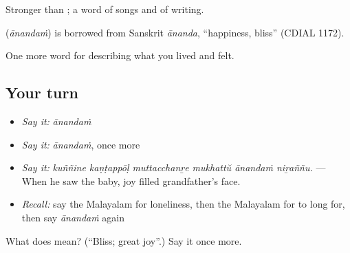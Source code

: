 Stronger than ; a word of songs and of writing.

\begin{cousinweb}
\textbf{} (\emph{ānandaṁ}) is borrowed from Sanskrit \emph{ānanda}, \textquotedblleft{}happiness, bliss\textquotedblright{} (CDIAL 1172).
\end{cousinweb}

\begin{grammarlens}[title={What you've built}]
One more word for describing what you lived and felt.
\end{grammarlens}

\subsection*{Your turn}
\begin{itemize}
\raggedright
  \item \emph{Say it:} \emph{ānandaṁ}
  \item \emph{Say it:} \emph{ānandaṁ}, once more
  \item \emph{Say it:} \emph{kuññine kaṇṭappōḷ muttacchanṟe mukhattŭ ānandaṁ niṟaññu.} — When he saw the baby, joy filled grandfather's face.
  \item \emph{Recall:} say the Malayalam for loneliness, then the Malayalam for to long for, then say \emph{ānandaṁ} again
\end{itemize}

\begin{tcolorbox}[breakable,colback=teal!4,colframe=teal!35!black,title={Before you move on}]
What does  mean? (\textquotedblleft{}Bliss; great joy\textquotedblright{}.) Say it once more.
\end{tcolorbox}
